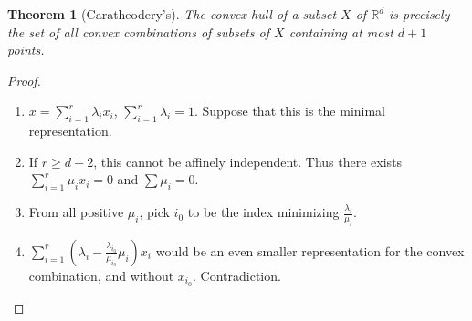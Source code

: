 \documentclass[a4paper,10pt,landscape]{article}
\newtheorem{theorem}{Theorem}[section]
\def\R{\mathbb{R}}
\begin{document}
\begin{multicols}{3}
  \begin{theorem}[Caratheodery's]
    The convex hull of a subset $X$ of $\R^d$ is precisely the set of all convex
    combinations of subsets of $X$ containing at most $d+1$ points.
  \end{theorem}
  \begin{proof}
    \begin{enumerate}
      \item $x = \sum_{i=1}^{r} \lambda_i x_i$, $\sum_{i=1}^{r} \lambda_i = 1$.
        Suppose that this is the minimal representation.
      \item If $r \ge d + 2$, this cannot be affinely independent. Thus there
        exists $\sum_{i=1}^{r} \mu_i x_i = 0$ and $\sum \mu_i = 0$.
      \item From all positive $\mu_i$, pick $i_0$ to be the index minimizing
        $\frac{\lambda_i}{\mu_i}$.
      \item $\sum_{i=1}^{r} (\lambda_i - \frac{\lambda_{i_0}}{\mu_{i_0}}
        \mu_{i}) x_i$ would be an even smaller representation for the convex
        combination, and without $x_{i_0}$. Contradiction.
    \end{enumerate}
  \end{proof}


\end{multicols}
\end{document}
